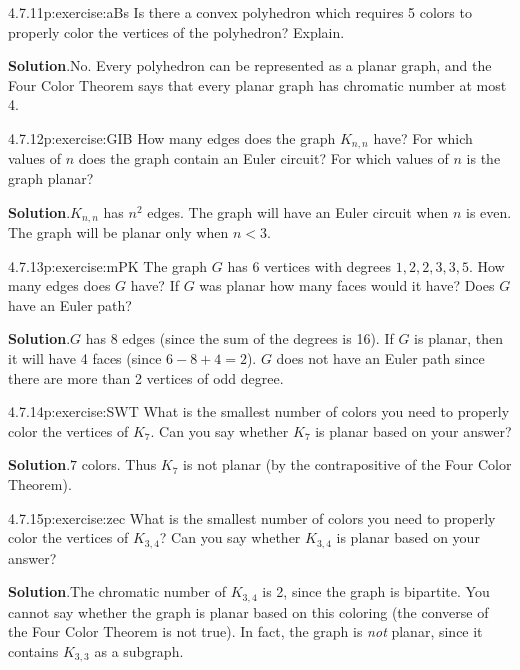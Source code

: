 \documentclass[twoside,11pt,]{book}
\newcommand{\blocktitlefont}{\relax}
\numberwithin{equation}{chapter}
\newcommand{\lt}{<}
\begin{document}
\begin{divisionsolution}{4.7.11}{}{p:exercise:aBs}%
Is there a convex polyhedron which requires 5 colors to properly color the vertices of the polyhedron? Explain.%
\par\smallskip%
\noindent\textbf{\blocktitlefont Solution}.\quad{}No. Every polyhedron can be represented as a planar graph, and the Four Color Theorem says that every planar graph has chromatic number at most 4.%
\end{divisionsolution}%
\begin{divisionsolution}{4.7.12}{}{p:exercise:GIB}%
How many edges does the graph \(K_{n,n}\) have? For which values of \(n\) does the graph contain an Euler circuit? For which values of \(n\) is the graph planar?%
\par\smallskip%
\noindent\textbf{\blocktitlefont Solution}.\quad{}\(K_{n,n}\) has \(n^2\) edges. The graph will have an Euler circuit when \(n\) is even. The graph will be planar only when \(n \lt 3\).%
\end{divisionsolution}%
\begin{divisionsolution}{4.7.13}{}{p:exercise:mPK}%
The graph \(G\) has 6 vertices with degrees \(1, 2, 2, 3, 3, 5\). How many edges does \(G\) have? If \(G\) was planar how many faces would it have? Does \(G\) have an Euler path?%
\par\smallskip%
\noindent\textbf{\blocktitlefont Solution}.\quad{}\(G\) has 8 edges (since the sum of the degrees is 16). If \(G\) is planar, then it will have 4 faces (since \(6 - 8 + 4 = 2\)). \(G\) does not have an Euler path since there are more than 2 vertices of odd degree.%
\end{divisionsolution}%
\begin{divisionsolution}{4.7.14}{}{p:exercise:SWT}%
What is the smallest number of colors you need to properly color the vertices of \(K_{7}\). Can you say whether \(K_7\) is planar based on your answer?%
\par\smallskip%
\noindent\textbf{\blocktitlefont Solution}.\quad{}\(7\) colors. Thus \(K_7\) is not planar (by the contrapositive of the Four Color Theorem).%
\end{divisionsolution}%
\begin{divisionsolution}{4.7.15}{}{p:exercise:zec}%
What is the smallest number of colors you need to properly color the vertices of \(K_{3,4}\)? Can you say whether \(K_{3,4}\) is planar based on your answer?%
\par\smallskip%
\noindent\textbf{\blocktitlefont Solution}.\quad{}The chromatic number of \(K_{3,4}\) is 2, since the graph is bipartite. You cannot say whether the graph is planar based on this coloring (the converse of the Four Color Theorem is not true). In fact, the graph is \emph{not} planar, since it contains \(K_{3,3}\) as a subgraph.%
\end{divisionsolution}%
\end{document}
